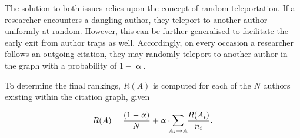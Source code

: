 The solution to both issues relies upon the concept of random teleportation. If a researcher encounters a dangling author, they teleport to another author uniformly at random. However, this can be further generalised to facilitate the early exit from author traps as well. Accordingly, on every occasion a researcher follows an outgoing citation, they may randomly teleport to another author in the graph with a probability of $1-\upalpha$.

To determine the final rankings, $R(A)$ is computed for each of the $N$ authors existing within the citation graph, given

\[R(A) = \frac{(1-\upalpha)}{N} + \upalpha \cdot \mathlarger{\sum}_{\mathclap{A_i \rightarrow A}} \ \frac{R(A_i)}{n_i}.\]
